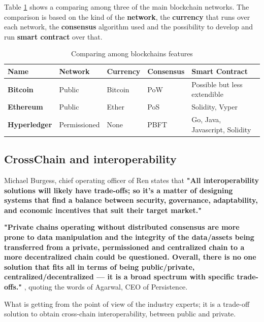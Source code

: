 \bigskip

Table \ref{table-compare-blockchains} shows a comparing among three of the main blockchain networks. The comparison
is based on the kind of the \textbf{network}, the \textbf{currency} that runs over each network, the \textbf{consensus} 
algorithm used and the possibility to develop and run \textbf{smart contract} over that. 

\begin{table}[h]
    {\renewcommand\arraystretch{1.25}
    \begin{tabular}{|l|l|l|l|l|} \hline
    \textbf{Name} & \textbf{Network} & \textbf{Currency} & \textbf{Consensus} & \textbf{Smart Contract}\\ \hline\hline
    \textbf{Bitcoin} & Public & Bitcoin & PoW & Possible but less extendible\\ \hline
    \textbf{Ethereum} & Public & Ether & PoS & Solidity, Vyper\\ \hline
    \textbf{Hyperledger} & Permissioned & None & PBFT & Go, Java, Javascript, Solidity\\ \hline
    \end{tabular}}
    \caption{Comparing among blockchains features}
    \label{table-compare-blockchains}
\end{table}

\subsection{CrossChain and interoperability}

Michael Burgess, chief operating officer of Ren states that \textbf{"All interoperability solutions will 
likely have trade-offs; so it's a matter of designing systems that find a balance between security, 
governance, adaptability, and economic incentives that suit their target market."}
\bigskip

\textbf{"Private chains operating without distributed consensus are more prone to data manipulation 
and the integrity of the data/assets being transferred from a private, permissioned and centralized 
chain to a more decentralized chain could be questioned. Overall, there is no one solution that fits 
all in terms of being public/private, centralized/decentralized — it is a broad spectrum with specific 
trade-offs."}\cite{interoperability1}
, quoting the words of Agarwal, CEO of Persistence.
\bigskip

What is getting from the point of view of the industry experts; it is a trade-off solution to obtain cross-chain 
interoperability, between public and private.

